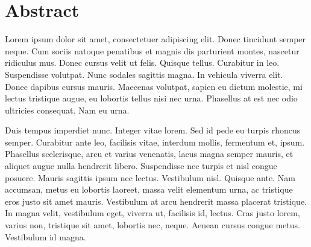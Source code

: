 \section*{Abstract}

Lorem ipsum dolor sit amet, consectetuer adipiscing elit. Donec
tincidunt semper neque. Cum sociis natoque penatibus et magnis dis
parturient montes, nascetur ridiculus mus. Donec cursus velit ut
felis. Quisque tellus. Curabitur in leo. Suspendisse volutpat. Nunc
sodales sagittis magna. In vehicula viverra elit. Donec dapibus cursus
mauris. Maecenas volutpat, sapien eu dictum molestie, mi lectus
tristique augue, eu lobortis tellus nisi nec urna. Phasellus at est
nec odio ultricies consequat. Nam eu urna. 

Duis tempus imperdiet nunc. Integer vitae lorem. Sed id pede eu turpis
rhoncus semper. Curabitur ante leo, facilisis vitae, interdum mollis,
fermentum et, ipsum. Phasellus scelerisque, arcu et varius venenatis,
lacus magna semper mauris, et aliquet augue nulla hendrerit
libero. Suspendisse nec turpis et nisl congue posuere. Mauris sagittis
ipsum nec lectus. Vestibulum nisl. Quisque ante. Nam accumsan, metus
eu lobortis laoreet, massa velit elementum urna, ac tristique eros
justo sit amet mauris. Vestibulum at arcu hendrerit massa placerat
tristique. In magna velit, vestibulum eget, viverra ut, facilisis id,
lectus. Cras justo lorem, varius non, tristique sit amet, lobortis
nec, neque. Aenean cursus congue metus. Vestibulum id magna.


